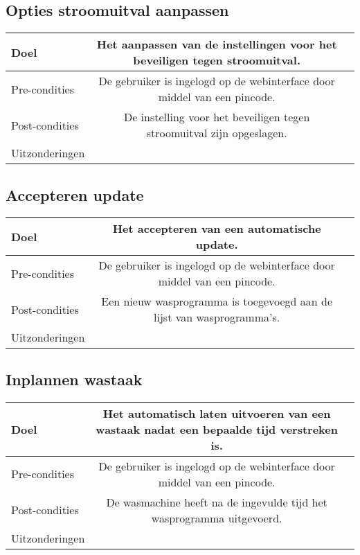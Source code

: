 \subsection{Opties stroomuitval aanpassen}
\begin{center}
  \begin{tabular}{ l | c | r | }
    \hline
    Doel & Het aanpassen van de instellingen voor het beveiligen tegen stroomuitval. \\ \hline
    Pre-condities & De gebruiker is ingelogd op de webinterface door middel van een pincode. \\ \hline
    Post-condities & De instelling voor het beveiligen tegen stroomuitval zijn opgeslagen. \\ \hline
    Uitzonderingen &  \\
    \hline
  \end{tabular}
\end{center}

\subsection{Accepteren update}
\begin{center}
  \begin{tabular}{ l | c | r | }
    \hline
    Doel & Het accepteren van een automatische update. \\ \hline
    Pre-condities & De gebruiker is ingelogd op de webinterface door middel van een pincode. \\ \hline
    Post-condities & Een nieuw wasprogramma is toegevoegd aan de lijst van wasprogramma's. \\ \hline
    Uitzonderingen &  \\
    \hline
  \end{tabular}
\end{center}

\subsection{Inplannen wastaak}
\begin{center}
  \begin{tabular}{ l | c | r | }
    \hline
    Doel & Het automatisch laten uitvoeren van een wastaak nadat een bepaalde tijd verstreken is. \\ \hline
    Pre-condities & De gebruiker is ingelogd op de webinterface door middel van een pincode. \\ \hline
    Post-condities & De wasmachine heeft na de ingevulde tijd het wasprogramma uitgevoerd. \\ \hline
    Uitzonderingen &  \\
    \hline
  \end{tabular}
\end{center}

